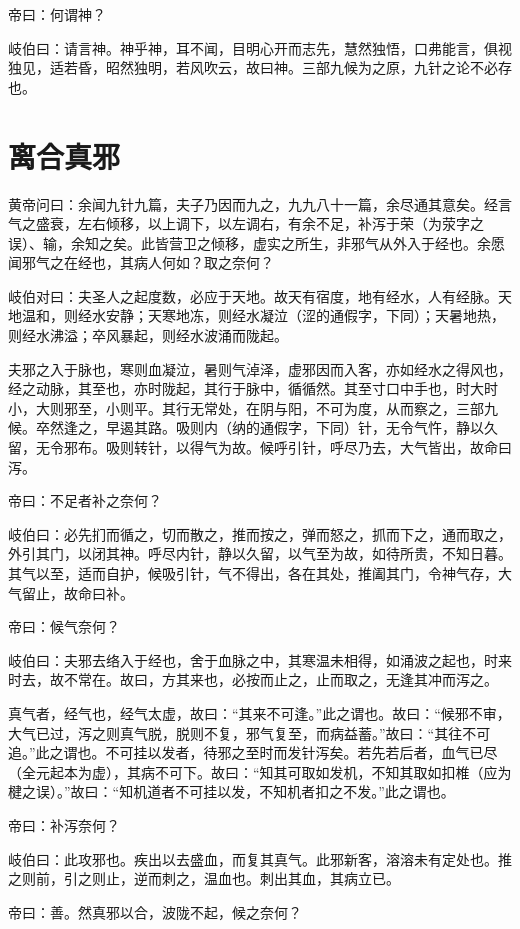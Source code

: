 \documentclass{article}%
\begin{document}
帝曰：何谓神？

岐伯曰：请言神。神乎神，耳不闻，目明心开而志先，慧然独悟，口弗能言，俱视独见，适若昏，昭然独明，若风吹云，故曰神。三部九候为之原，九针之论不必存也。
\section{离合真邪}
黄帝问曰：余闻九针九篇，夫子乃因而九之，九九八十一篇，余尽通其意矣。经言气之盛衰，左右倾移，以上调下，以左调右，有余不足，补泻于荣（为荥字之误）、输，余知之矣。此皆营卫之倾移，虚实之所生，非邪气从外入于经也。余愿闻邪气之在经也，其病人何如？取之奈何？

岐伯对曰：夫圣人之起度数，必应于天地。故天有宿度，地有经水，人有经脉。天地温和，则经水安静；天寒地冻，则经水凝泣（涩的通假字，下同）；天暑地热，则经水沸溢；卒风暴起，则经水波涌而陇起。

夫邪之入于脉也，寒则血凝泣，暑则气淖泽，虚邪因而入客，亦如经水之得风也，经之动脉，其至也，亦时陇起，其行于脉中，循循然。其至寸口中手也，时大时小，大则邪至，小则平。其行无常处，在阴与阳，不可为度，从而察之，三部九候。卒然逢之，早遏其路。吸则内（纳的通假字，下同）针，无令气忤，静以久留，无令邪布。吸则转针，以得气为故。候呼引针，呼尽乃去，大气皆出，故命曰泻。

帝曰：不足者补之奈何？

岐伯曰：必先扪而循之，切而散之，推而按之，弹而怒之，抓而下之，通而取之，外引其门，以闭其神。呼尽内针，静以久留，以气至为故，如待所贵，不知日暮。其气以至，适而自护，候吸引针，气不得出，各在其处，推阖其门，令神气存，大气留止，故命曰补。

帝曰：候气奈何？

岐伯曰：夫邪去络入于经也，舍于血脉之中，其寒温未相得，如涌波之起也，时来时去，故不常在。故曰，方其来也，必按而止之，止而取之，无逢其冲而泻之。

真气者，经气也，经气太虚，故曰：“其来不可逢。”此之谓也。故曰：“候邪不审，大气已过，泻之则真气脱，脱则不复，邪气复至，而病益蓄。”故曰：“其往不可追。”此之谓也。不可挂以发者，待邪之至时而发针泻矣。若先若后者，血气已尽（全元起本为虚），其病不可下。故曰：“知其可取如发机，不知其取如扣椎（应为楗之误）。”故曰：“知机道者不可挂以发，不知机者扣之不发。”此之谓也。

帝曰：补泻奈何？

岐伯曰：此攻邪也。疾出以去盛血，而复其真气。此邪新客，溶溶未有定处也。推之则前，引之则止，逆而刺之，温血也。刺出其血，其病立已。

帝曰：善。然真邪以合，波陇不起，候之奈何？
\end{document}
